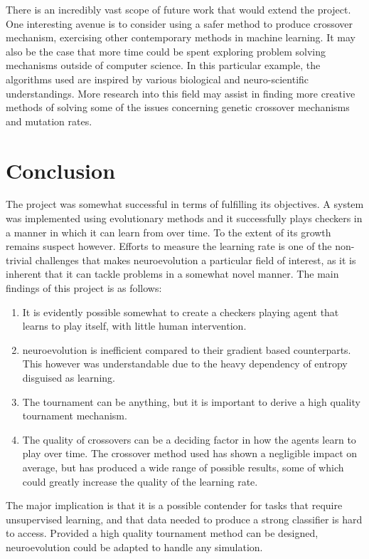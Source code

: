 \documentclass[12pt,a4paper]{article}
\begin{document}
        There is an incredibly vast scope of future work that would extend the project. One interesting avenue is to consider using a safer method to produce crossover mechanism, exercising other contemporary methods in machine learning. It may also be the case that more time could be spent exploring problem solving mechanisms  outside of computer science. In this particular example, the algorithms used are inspired by various biological and neuro-scientific understandings. More research into this field may assist in finding more creative methods of solving some of the issues concerning genetic crossover mechanisms and mutation rates.
    


\section{Conclusion}

    The project was somewhat successful in terms of fulfilling its objectives. A system was implemented using evolutionary methods and it successfully plays checkers in a manner in which it can learn from over time. To the extent of its growth remains suspect however. Efforts to measure the learning rate is one of the non-trivial challenges that makes neuroevolution a particular field of interest, as it is inherent that it can tackle problems in a somewhat novel manner. The main findings of this project is as follows:
    \begin{enumerate}
    \item It is evidently possible somewhat to create a checkers playing agent that learns to play itself, with little human intervention.
    \item  neuroevolution is inefficient compared to their gradient based counterparts. This however was understandable due to the heavy dependency of entropy disguised as learning.
    \item  The tournament can be anything, but it is important to derive a high quality tournament mechanism.
    \item The quality of crossovers can be a deciding factor in how the agents learn to play over time. The crossover method used has shown a negligible impact on average, but has produced a wide range of possible results, some of which could greatly increase the quality of the learning rate.
    \end{enumerate}

    The major implication is that it is a possible contender for tasks that require unsupervised learning, and that data needed to produce a strong classifier is hard to access. Provided a high quality tournament method can be designed, neuroevolution could be adapted to handle any simulation.


\end{document}
